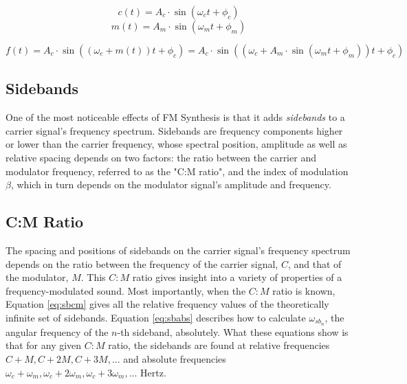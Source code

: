 \begin{multicols}{2}
  \begin{equation}
    c(t) = A_{c} \cdot \sin(\omega_{c}t + \phi_{c})
    \end{equation}\break
    \begin{equation}
      m(t) = A_{m} \cdot \sin(\omega_{m}t + \phi_{m})
    \end{equation}
  \end{multicols}

  \begin{equation}
    f(t) = A_{c} \cdot \sin((\omega_{c} + m(t))t + \phi_{c}) = A_{c} \cdot \sin((\omega_{c} + A_{m} \cdot \sin(\omega_{m}t + \phi_{m}))t + \phi_{c})
    \label{eq:fm}
  \end{equation}

  \subsection{Sidebands}

  One of the most noticeable effects of FM Synthesis is that it adds \emph{sidebands} to a carrier signal's frequency spectrum. Sidebands are frequency components higher or lower than the carrier frequency, whose spectral position, amplitude as well as relative spacing depends on two factors: the ratio between the carrier and modulator frequency, referred to as the "C:M ratio", and the index of modulation $\beta$, which in turn depends on the modulator signal's amplitude and frequency.

  \subsection{C:M Ratio}

  The spacing and positions of sidebands on the carrier signal's frequency spectrum depends on the ratio between the frequency of the carrier signal, $C$, and that of the modulator, $M$. This $C:M$ ratio gives insight into a variety of properties of a frequency-modulated sound. Most importantly, when the $C:M$ ratio is known, Equation \ref{eq:sbcm} gives all the relative frequency values of the theoretically infinite set of sidebands. Equation \ref{eq:sbabs} describes how to calculate $\omega_{sb_{n}}$, the angular frequency of the $n$-th sideband, absolutely. What these equations show is that for any given $C:M$ ratio, the sidebands are found at relative frequencies $C + M, C + 2M, C + 3M, ... $ and absolute frequencies %
  $\omega_{c} + \omega_{m}, \omega_{c} + 2 \omega_{m},\omega_{c} + 3 \omega_{m}, ...$ Hertz.


